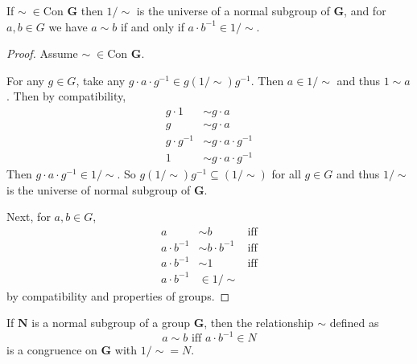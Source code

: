 \begin{theorem*}
If $\sim\; \in \text{Con }\mathbf{G}$ then $1/\sim$ is the universe of a normal subgroup of $\mathbf{G}$, and for $a,b\in G$ we have $a\sim b$ if and only if $a\cdot b^{-1} \in 1/\sim$.
\end{theorem*}

\begin{proof}
Assume  $\sim\; \in \text{Con }\mathbf{G}$.

For any $g \in G$, take any $g\cdot a\cdot g^{-1} \in g(1/\sim)g^{-1}$.
Then $a \in 1/\sim$ and thus $1 \sim a$.
Then by compatibility, 
\begin{align*}
g\cdot 1       &\sim g\cdot a \\
g              &\sim g\cdot a \\
g \cdot g^{-1} &\sim g\cdot a \cdot g^{-1} \\
1              &\sim g\cdot a \cdot g^{-1}
\end{align*}
Then $g\cdot a \cdot g^{-1} \in 1/\sim$.
So $g(1/\sim)g^{-1} \subseteq (1/\sim)$ for all $g \in G$ and thus $1/\sim$ is the universe of  normal subgroup of $\mathbf{G}$.

Next, for $a, b \in G$,
\begin{align*}
a            &\sim b              & \text{iff} \\
a\cdot b^{-1} &\sim b\cdot b^{-1} & \text{iff} \\
a\cdot b^{-1} &\sim 1             & \text{iff} \\
a\cdot b^{-1} &\in 1/\sim         
\end{align*}
by compatibility and properties of groups.
\end{proof}

\begin{theorem*}
If $\mathbf{N}$ is a normal subgroup of a group $\mathbf{G}$, then the relationship $\sim$ defined as
\[
 a\sim b \text{ iff } a\cdot b^{-1} \in N
\]
is a congruence on $\mathbf{G}$ with $1/\sim = N$.
\end{theorem*}

